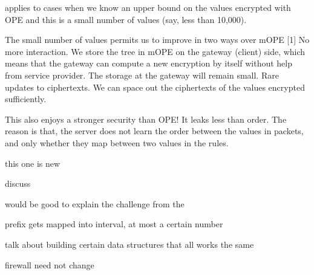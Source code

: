 \RM applies to cases when we know an upper bound on the values encrypted with OPE and this is a small number of values (say, less than 10,000).

The small number of values permits us to improve in two ways over mOPE [1]
No more interaction. We store the tree in mOPE on the gateway (client) side, which means that the gateway can compute a new encryption by itself without help from service provider. The storage at the gateway will remain small.
Rare updates to ciphertexts. We can space out the ciphertexts of the values encrypted sufficiently. 

This also enjoys a stronger security than OPE! It leaks less than order.
The reason is that, the server does not learn the order between the values in packets, and only whether they map between two values in the rules. 

this one is new

discuss 

would be good to explain the challenge from the 


prefix gets mapped into interval, at most a certain number

talk about building certain data structures that all works the same

firewall need not change 
